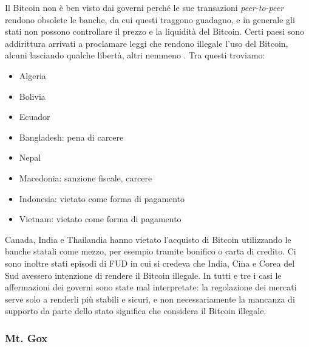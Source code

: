 \documentclass {article}
\begin{document}
Il Bitcoin non è ben visto dai governi perché le sue transazioni \textit{peer-to-peer} rendono obsolete le banche, da cui questi traggono guadagno, e in generale gli stati non possono controllare il prezzo e la liquidità del Bitcoin.
Certi paesi sono addirittura arrivati a proclamare leggi che rendono illegale l'uso del Bitcoin, alcuni lasciando qualche libertà, altri nemmeno \cite{legality}.
Tra questi troviamo:

\begin{itemize}
\item Algeria
\item Bolivia
\item Ecuador
\item Bangladesh: pena di carcere
\item Nepal
\item Macedonia: sanzione fiscale, carcere
\item Indonesia: vietato come forma di pagamento
\item Vietnam: vietato come forma di pagamento
\end{itemize}
%
Canada, India e Thailandia hanno vietato l'acquisto di Bitcoin utilizzando le banche statali come mezzo, per esempio tramite bonifico o carta di credito.
Ci sono inoltre stati episodi di FUD in cui si credeva che India, Cina e Corea del Sud avessero intenzione di rendere il Bitcoin illegale.
In tutti e tre i casi le affermazioni dei governi sono state mal interpretate: la regolazione dei mercati serve solo a renderli più stabili e sicuri, e non necessariamente la mancanza di supporto da parte dello stato significa che considera il Bitcoin illegale.
%

\subsubsection {Mt. Gox}
\end{document}
